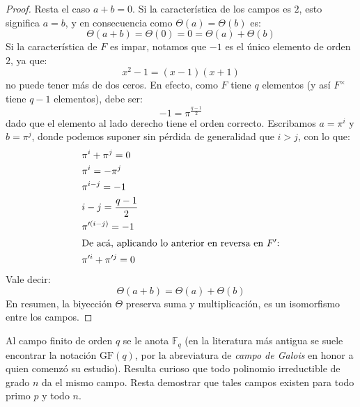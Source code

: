 \begin{proof}
    Resta el caso \(a + b = 0\).
    Si la característica de los campos es \(2\),
    esto significa \(a = b\),
    y en consecuencia como \(\Theta(a) = \Theta(b)\)
    es:
    \begin{equation*}
      \Theta(a + b)
	= \Theta(0)
	= 0
	= \Theta(a) + \Theta(b)
    \end{equation*}
    Si la característica de \(F\) es impar,
    notamos que \(-1\) es el único elemento de orden \(2\),
    ya que:
    \begin{equation*}
      x^2 - 1
	= (x - 1) (x + 1)
    \end{equation*}
    no puede tener más de dos ceros.
    En efecto,
    como \(F\) tiene \(q\) elementos
    (y así \(F^\times\) tiene \(q - 1\) elementos),
    debe ser:
    \begin{equation*}
      -1 = \pi^{\frac{q - 1}{2}}
    \end{equation*}
    dado que el elemento al lado derecho tiene el orden correcto.
    Escribamos \(a = \pi^i\) y \(b = \pi^j\),
    donde podemos suponer sin pérdida de generalidad que \(i > j\),
    con lo que:
    \begin{align*}
      &\pi^i + \pi^j
	= 0 \\
      &\pi^i
	= - \pi^j \\
      &\pi^{i - j}
	= -1 \\
      &i - j
	= \frac{q - 1}{2} \\
      &\pi'^{(i - j)}
	= -1 \\
    \intertext{De acá, aplicando lo anterior en reversa en \(F'\):}
      &\pi'^i + \pi'^j
	= 0
    \end{align*}
    Vale decir:
    \begin{equation*}
      \Theta(a + b)
	= \Theta(a) + \Theta(b)
    \end{equation*}
    En resumen,
    la biyección \(\Theta\) preserva suma y multiplicación,
    es un isomorfismo entre los campos.
  \end{proof}
  Al campo finito de orden \(q\) se le anota \(\mathbb{F}_q\)
  (en la literatura más antigua se suele encontrar la notación
   \(\mathrm{GF}(q)\),
   por la abreviatura de \emph{campo de Galois}%
   en honor a quien comenzó su estudio).
  Resulta curioso que todo polinomio irreductible de grado \(n\)
  da el mismo campo.
  Resta demostrar que tales campos existen para todo primo \(p\)
  y todo \(n\).

